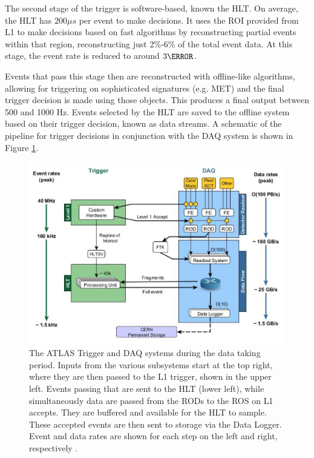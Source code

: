 The second stage of the trigger is software-based, known the \gls{HLT}. On average, the \gls{HLT} has $\unit{200}{\mu s}$ per event to make decisions. It uses the \gls{ROI} provided from \gls{L1} to make decisions based on fast algorithms by reconstructing partial events within that region, reconstructing just 2\%-6\% of the total event data. At this stage, the event rate is reduced to around $\unit{3}{\kHz}$.

Events that pass this stage then are reconstructed with offline-like algorithms, allowing for triggering on sophisticated signatures (e.g. \gls{MET}) and the final trigger decision is made using those objects. This produces a final output between 500 and 1000 Hz. Events selected by the \gls{HLT} are saved to the offline system based on their trigger decision, known as data streams. A schematic of the pipeline for trigger decisions in conjunction with the \gls{DAQ} system is shown in Figure \ref{fig:trigger-schematic}.


\begin{figure}[!ht]
    \centering
    \includegraphics[width=.80\textwidth]{chapters/chapter2_experiment/images/trigger.png}
    \caption[The ATLAS Trigger and DAQ system during the \RunTwo data taking period]{The ATLAS Trigger and DAQ systems during the \RunTwo data taking period. Inputs from the various subsystems start at the top right, where they are then passed to the \gls{L1} trigger, shown in the upper left. Events passing that are sent to the \gls{HLT} (lower left), while simultaneously data are passed from the \glspl{ROD} to the \gls{ROS} on \gls{L1} accepts. They are buffered and available for the \gls{HLT} to sample. These accepted events are then sent to storage via the Data Logger. Event and data rates are shown for each step on the left and right, respectively \cite{trigger-run2}.}
    \label{fig:trigger-schematic}
\end{figure}

